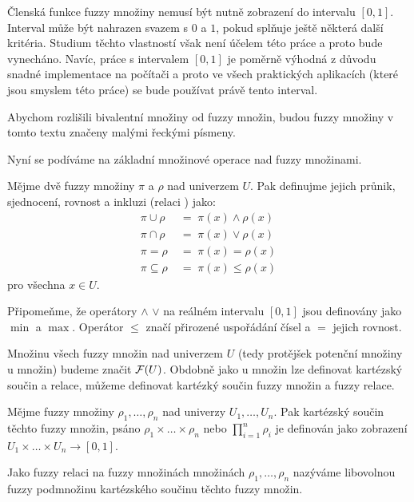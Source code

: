 \documentclass[a4paper,10pt]{article}
\begin{document}
\begin{note}
 Členská funkce fuzzy množiny nemusí být nutně zobrazení do intervalu $[0, 1]$. Interval může být nahrazen svazem s $0$ a $1$, pokud splňuje ještě některá další kritéria. Studium těchto vlastností však není účelem této práce a proto bude vynecháno. Navíc, práce s intervalem $[0 ,1]$ je poměrně výhodná z důvodu snadné implementace na počítači a proto ve všech praktických aplikacích (které jsou smyslem této práce) se bude používat právě tento interval.
\end{note}

\begin{notation*}
 Abychom rozlišili  bivalentní množiny od fuzzy množin, budou fuzzy množiny v tomto textu značeny malými řeckými písmeny.
\end{notation*}

Nyní se podíváme na základní množinové operace nad fuzzy množinami.
\begin{definition}
 Mějme dvě fuzzy množiny $\pi$ a $\rho$ nad univerzem $U$. Pak definujme jejich průnik, sjednocení, rovnost a inkluzi (relaci ) jako:
 \begin{align*}
  \pi \cup \rho 	\; &= \; \pi(x) \wedge \rho(x) \\
  \pi \cap \rho 	\; &= \; \pi(x) \vee \rho(x) \\
  \pi = \rho 		\; &= \; \pi(x) = \rho(x) \\
  \pi \subseteq \rho 	\; &= \; \pi(x) \le \rho(x) 
 \end{align*}
 pro všechna $x \in U$.
\end{definition}

Připomeňme, že operátory $\wedge$ $\vee$ na reálném intervalu $[0, 1]$ jsou definovány jako $\min$ a $\max$. Operátor $\le$ značí přirozené uspořádání čísel a $=$ jejich rovnost.

Množinu všech fuzzy množin nad univerzem $U$ (tedy protějšek potenční množiny u  množin) budeme značit $\mathcal{F}(U)$. Obdobně jako u  množin lze definovat kartézský součin a relace, můžeme definovat kartézký součin fuzzy množin a fuzzy relace. 

\begin{definition}
 Mějme fuzzy množiny $\rho_1, \dots, \rho_n$ nad univerzy $U_1, \dots, U_n$. Pak kartézský součin těchto fuzzy množin, psáno $\rho_1 \times \dots \times \rho_n$ nebo $\prod_{i=1}^n \rho_i$ je definován jako zobrazení $U_1 \times \dots \times U_n \rightarrow [0, 1]$.
 
\end{definition}
\begin{definition}
 Jako fuzzy relaci na fuzzy množinách množinách $\rho_1, \dots, \rho_n$ nazýváme libovolnou fuzzy podmnožinu kartézského součinu těchto fuzzy množin.
\end{definition}
\end{document}
